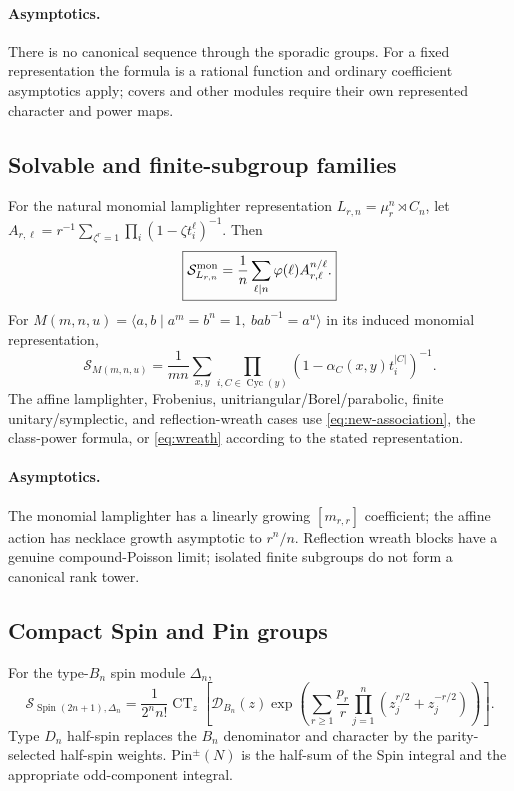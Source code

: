 \documentclass[10pt]{article}
\newcommand{\CT}{\operatorname{CT}}
\newcommand{\MGF}{\mathcal S}
\newcommand{\Cyc}{\operatorname{Cyc}}
\begin{document}
\paragraph{Asymptotics.}
There is no canonical sequence through the sporadic groups.  For a fixed
representation the formula is a rational function and ordinary coefficient
asymptotics apply; covers and other modules require their own represented
character and power maps.

\subsection{Solvable and finite-subgroup families}
For the natural monomial lamplighter representation
$L_{r,n}=\mu_r^n\rtimes C_n$, let
$A_{r,\ell}=r^{-1}\sum_{\zeta^r=1}\prod_i(1-\zeta t_i^\ell)^{-1}$.  Then
\[
 \boxed{\MGF^{\rm mon}_{L_{r,n}}=\frac1n\sum_{\ell\mid n}
 \varphi(\ell)A_{r,\ell}^{n/\ell}.}
\]
For $M(m,n,u)=\langle a,b\mid a^m=b^n=1,\ bab^{-1}=a^u\rangle$ in its
induced monomial representation,
\[
 \boxed{\MGF_{M(m,n,u)}=\frac1{mn}\sum_{x,y}
 \prod_{i,C\in\Cyc(y)}(1-\alpha_C(x,y)t_i^{|C|})^{-1}.}
\]
The affine lamplighter, Frobenius, unitriangular/Borel/parabolic, finite
unitary/symplectic, and reflection-wreath cases use
\eqref{eq:new-association}, the class-power formula, or
\eqref{eq:wreath} according to the stated representation.
\paragraph{Asymptotics.}
The monomial lamplighter has a linearly growing $[m_{r,r}]$ coefficient; the
affine action has necklace growth asymptotic to $r^n/n$.  Reflection wreath
blocks have a genuine compound-Poisson limit; isolated finite subgroups do not
form a canonical rank tower.

\subsection{Compact Spin and Pin groups}
For the type-$B_n$ spin module $\Delta_n$,
\begin{equation}\label{eq:new-spin}
 \boxed{\MGF_{\operatorname{Spin}(2n+1),\Delta_n}=
 \frac1{2^nn!}\CT_z\!\left[\mathcal D_{B_n}(z)
 \exp\!\left(\sum_{r\ge1}\frac{p_r}{r}
 \prod_{j=1}^n(z_j^{r/2}+z_j^{-r/2})\right)\right].}
\end{equation}
Type $D_n$ half-spin replaces the $B_n$ denominator and character by the
parity-selected half-spin weights.  Pin$^\pm(N)$ is the half-sum of the Spin
integral and the appropriate odd-component integral.
\end{document}

